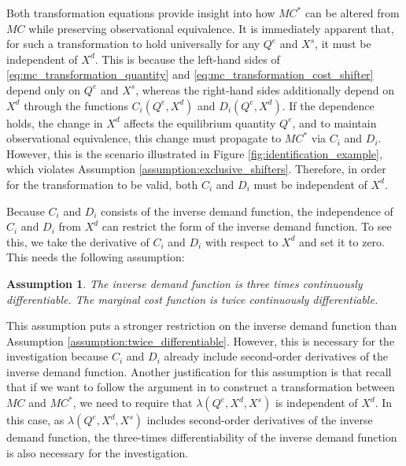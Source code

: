 \documentclass[11pt, a4paper]{article}
\newtheorem{assumption}{Assumption}
\theoremstyle{remark}
\begin{document}
Both transformation equations provide insight into how $MC^{*}$ can be altered from $MC$ while preserving observational equivalence.
It is immediately apparent that, for such a transformation to hold universally for any $Q^e$ and $X^{s}$, it must be independent of $X^{d}$.
This is because the left-hand sides of \eqref{eq:mc_transformation_quantity} and \eqref{eq:mc_transformation_cost_shifter} depend only on $Q^e$ and $X^{s}$, whereas the right-hand sides additionally depend on $X^{d}$ through the functions $C_i(Q^e, X^{d})$ and $D_i(Q^e, X^{d})$.
If the dependence holds, the change in $X^{d}$ affects the equilibrium quantity $Q^e$, and to maintain observational equivalence, this change must propagate to $MC^{*}$ via $C_i$ and $D_i$.
However, this is the scenario illustrated in Figure \ref{fig:identification_example}, which violates Assumption \ref{assumption:exclusive_shifters}.
Therefore, in order for the transformation to be valid, both $C_i$ and $D_i$ must be independent of $X^{d}$.

Because $C_i$ and $D_i$ consists of the inverse demand function, the independence of $C_i$ and $D_i$ from $X^{d}$ can restrict the form of the inverse demand function.
To see this, we take the derivative of $C_i$ and $D_i$ with respect to $X^{d}$ and set it to zero.
This needs the following assumption:
\begin{assumption}\label{assumption:three_times_differentiable}
    The inverse demand function is three times continuously differentiable.
    The marginal cost function is twice continuously differentiable.
\end{assumption}
This assumption puts a stronger restriction on the inverse demand function than Assumption \ref{assumption:twice_differentiable}.
However, this is necessary for the investigation because $C_i$ and $D_i$ already include second-order derivatives of the inverse demand function.
Another justification for this assumption is that recall that if we want to follow the argument in \citet{lau1982identifying} to construct a transformation between $MC$ and $MC^{*}$, we need to require that $\lambda(Q^e, X^{d}, X^{s})$ is independent of $X^{d}$.
In this case, as $\lambda(Q^e, X^{d}, X^{s})$ includes second-order derivatives of the inverse demand function, the three-times differentiability of the inverse demand function is also necessary for the investigation.

\end{document}
